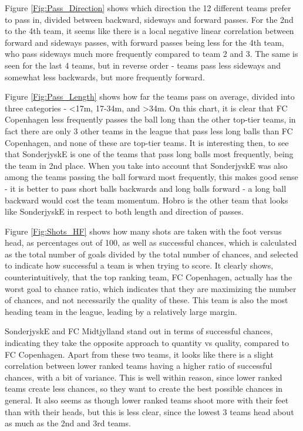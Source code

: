 \documentclass[Report.tex]{subfiles}
\begin{document}
Figure \ref{Fig:Pass_Direction} shows which direction the 12 different teams prefer to pass in,
divided between backward, sideways and forward passes. For the 2nd to the 4th
team, it seems like there is a local negative linear correlation between forward
and sideways passes, with forward passes being less for the 4th team, who pass
sideways much more frequently compared to team 2 and 3. The same is seen for the
last 4 teams, but in reverse order - teams pass less sideways and somewhat less
backwards, but more frequently forward. 

Figure \ref{Fig:Pass_Length} shows how far the teams pass on average, divided into three
categories - <17m, 17-34m, and >34m. 
On this chart, it is clear that FC Copenhagen less frequently passes the ball
long than the other top-tier teams, in fact there are only 3 other teams in the
league that pass less long balls than FC Copenhagen, and none of these are
top-tier teams. It is interesting then, to see that SonderjyskE is one of the
teams that pass long balls most frequently, being the team in 2nd place. When
you take into account that SonderjyskE was also among the teams passing the ball
forward most frequently, this makes good sense - it is better to pass short
balls backwards and long balls forward - a long ball backward would cost the
team momentum. Hobro is the other team that looks like SonderjyskE in respect to
both length and direction of passes. 

Figure \ref{Fig:Shots_HF} shows how many shots are taken with the foot versus head, as
percentages out of 100, as well as successful chances, which is calculated as
the total number of goals divided by the total number of chances, and selected
to indicate how successful a team is when trying to score. 
It clearly shows, counterintuitively, that the top ranking team, FC Copenhagen,
actually has the worst goal to chance ratio, which indicates that they are
maximizing the number of chances, and not necessarily the quality of these. This
team is also the most heading team in the league, leading by a relatively large
margin. 

SonderjyskE and FC Midtjylland stand out in terms of successful chances,
indicating they take the opposite approach to quantity vs quality, compared to
FC Copenhagen. Apart from these two teams, it looks like there is a slight
correlation between lower ranked teams having a higher ratio of successful
chances, with a bit of variance. This is well within reason, since lower ranked
teams create less chances, so they want to create the best possible chances in
general. It also seems as though lower ranked teams shoot more with their feet
than with their heads, but this is less clear, since the lowest 3 teams head
about as much as the 2nd and 3rd teams. 
\end{document}
